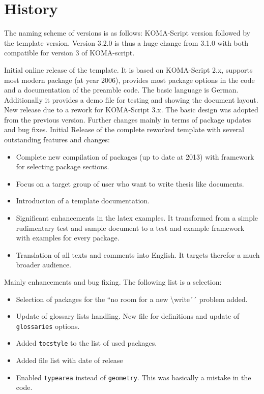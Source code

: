 
\chapter{History}

The naming scheme of versions is as follows: KOMA-Script version followed by the template version. Version 3.2.0 is thus
a huge change from 3.1.0 with both compatible for version 3 of KOMA-script.

Initial online release of the template. It is based on KOMA-Script 2.x,
supports most modern package (at year 2006), provides most package options in the code
and a documentation of the preamble code. The basic language is German.
Additionally it provides a demo file for testing and showing the document layout.
%
New release due to a rework for KOMA-Script 3.x. 
The basic design was adopted from the previous version.
Further changes mainly in terms of package updates and bug fixes.
%
Initial Release of the complete reworked template with several outstanding features and changes:
\begin{itemize}
\item Complete new compilation of packages (up to date at 2013) with framework for selecting package sections. 
\item Focus on a target group of user who want to write thesis like documents.
\item Introduction of a template documentation.
\item Significant enhancements in the latex examples. 
It transformed from a simple rudimentary test and sample document to a test and example framework
with examples for every package.
\item Translation of all texts and comments into English. It targets therefor a much broader audience.
\end{itemize}
%
Mainly enhancements and bug fixing. The following list is a selection:
\begin{itemize}
\item Selection of packages for the ``no room for a new \textbackslash{}write´´ problem added.  
\item Update of glossary lists handling. New file for definitions and update of \texttt{glossaries} options.
\item Added \texttt{tocstyle} to the list of used packages.
\item Added file list with date of release
\item Enabled \texttt{typearea} instead of \texttt{geometry}. This was basically a mistake in the code.
\end{itemize}
